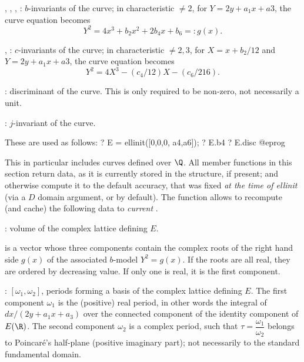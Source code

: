 \item {}, , , : $b$-invariants of the curve; in
characteristic $\neq 2$, for $Y = 2y + a_1x+a3$, the curve equation becomes
$$ Y^2 = 4 x^3 + b_2 x^2 + 2b_4 x + b_6 =: g(x). $$

\item {}, : $c$-invariants of the curve; in characteristic $\neq
2,3$, for $X = x + b_2/12$ and $Y = 2y + a_1x+a3$, the curve equation becomes
$$ Y^2 = 4 X^3 - (c_4/12) X - (c_6/216). $$

\item {}: discriminant of the curve. This is only required to be
non-zero, not necessarily a unit.

\item {}: $j$-invariant of the curve.

\noindent These are used as follows:
\bprog
? E = ellinit([0,0,0, a4,a6]);
? E.b4
? E.disc
@eprog


This in particular includes curves defined over $\Q$. All member functions in
this section return data, as it is currently stored in the structure, if
present; and otherwise compute it to the default accuracy, that was fixed
\emph{at the time of ellinit} (via a  $D$ domain argument, or
 by default). The function  allows to
recompute (and cache) the following data to \emph{current}
.

\item {}: volume of the complex lattice defining $E$.

\item {} is a vector whose three components contain the complex
roots of the right hand side $g(x)$ of the associated $b$-model $Y^2 = g(x)$.
If the roots are all real, they are ordered by decreasing value. If only one
is real, it is the first component.

\item {}: $[\omega_1,\omega_2]$, periods forming a basis of the
complex lattice defining $E$. The first component $\omega_1$ is the
(positive) real period, in other words the integral of $dx/(2y+a_1x+a_3)$
over the connected component of the identity component of $E(\R)$.
The second component $\omega_2$ is a complex period, such that
$\tau=\dfrac{\omega_1}{\omega_2}$ belongs to Poincar\'e's
half-plane (positive imaginary part); not necessarily to the standard
fundamental domain.


